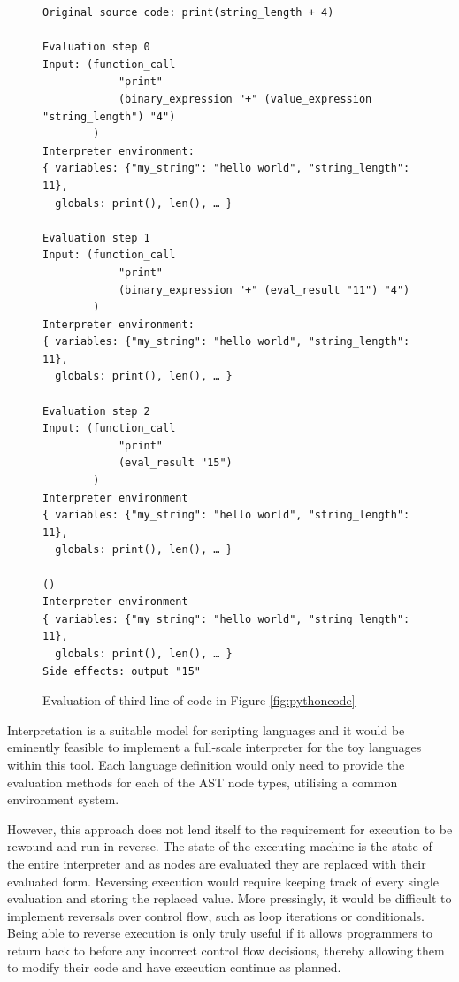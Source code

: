 \begin{figure}[H]
\centering
\begin{verbatim}
Original source code: print(string_length + 4)

Evaluation step 0
Input: (function_call
            "print"
            (binary_expression "+" (value_expression "string_length") "4")
        )
Interpreter environment:
{ variables: {"my_string": "hello world", "string_length": 11},
  globals: print(), len(), … }

Evaluation step 1
Input: (function_call
            "print"
            (binary_expression "+" (eval_result "11") "4")
        )
Interpreter environment:
{ variables: {"my_string": "hello world", "string_length": 11},
  globals: print(), len(), … }

Evaluation step 2
Input: (function_call
            "print"
            (eval_result "15")
        )
Interpreter environment
{ variables: {"my_string": "hello world", "string_length": 11},
  globals: print(), len(), … }

()
Interpreter environment
{ variables: {"my_string": "hello world", "string_length": 11},
  globals: print(), len(), … }
Side effects: output "15"
\end{verbatim}
\caption{Evaluation of third line of code in Figure \ref{fig:pythoncode}}
\label{fig:pythoneval3} %
\end{figure}

Interpretation is a suitable model for scripting languages and it would be eminently feasible to implement a full-scale interpreter for the toy languages within this tool. Each language definition would only need to provide the evaluation methods for each of the AST node types, utilising a common environment system.

However, this approach does not lend itself to the requirement for execution to be rewound and run in reverse. The state of the executing machine is the state of the entire interpreter and as nodes are evaluated they are replaced with their evaluated form. Reversing execution would require keeping track of every single evaluation and storing the replaced value. More pressingly, it would be difficult to implement reversals over control flow, such as loop iterations or conditionals. Being able to reverse execution is only truly useful if it allows programmers to return back to before any incorrect control flow decisions, thereby allowing them to modify their code and have execution continue as planned.

